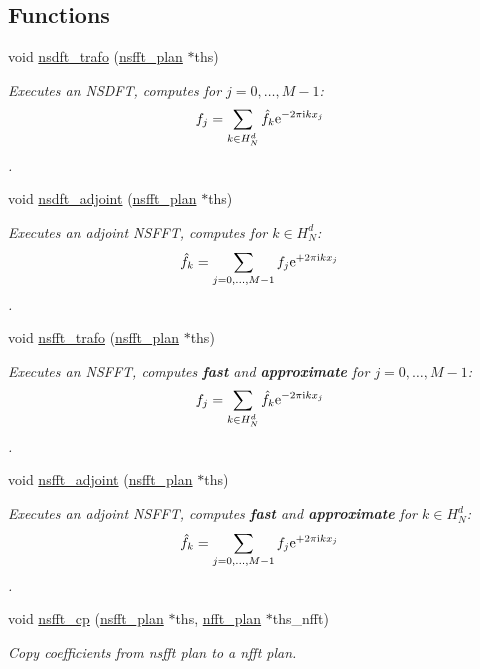 \subsection*{Functions}
\begin{CompactItemize}
\item 
void \hyperlink{group__nsfft_ga0}{nsdft\_\-trafo} (\hyperlink{structnsfft__plan}{nsfft\_\-plan} $\ast$ths)
\begin{CompactList}\small\item\em Executes an NSDFT, computes for $j=0,\hdots,M-1$: \[ f_j = \sum_{k\in H_N^d}\hat f_k {\rm e}^{-2\pi{\rm\scriptsize i}k x_j} \]. \item\end{CompactList}\item 
void \hyperlink{group__nsfft_ga1}{nsdft\_\-adjoint} (\hyperlink{structnsfft__plan}{nsfft\_\-plan} $\ast$ths)
\begin{CompactList}\small\item\em Executes an adjoint NSFFT, computes for $k\in H_N^d$: \[ \hat f_k = \sum_{j=0,\hdots,M-1} f_j {\rm e}^{+2\pi{\rm\scriptsize i}k x_j} \]. \item\end{CompactList}\item 
void \hyperlink{group__nsfft_ga2}{nsfft\_\-trafo} (\hyperlink{structnsfft__plan}{nsfft\_\-plan} $\ast$ths)
\begin{CompactList}\small\item\em Executes an NSFFT, computes {\bf fast} and {\bf approximate} for $j=0,\hdots,M-1$: \[ f_j = \sum_{k\in H_N^d}\hat f_k {\rm e}^{-2\pi{\rm\scriptsize i}k x_j} \]. \item\end{CompactList}\item 
void \hyperlink{group__nsfft_ga3}{nsfft\_\-adjoint} (\hyperlink{structnsfft__plan}{nsfft\_\-plan} $\ast$ths)
\begin{CompactList}\small\item\em Executes an adjoint NSFFT, computes {\bf fast} and {\bf approximate} for $k\in H_N^d$: \[ \hat f_k = \sum_{j=0,\hdots,M-1} f_j {\rm e}^{+2\pi{\rm\scriptsize i}k x_j} \]. \item\end{CompactList}\item 
void \hyperlink{group__nsfft_ga4}{nsfft\_\-cp} (\hyperlink{structnsfft__plan}{nsfft\_\-plan} $\ast$ths, \hyperlink{structnfft__plan}{nfft\_\-plan} $\ast$ths\_\-nfft)
\begin{CompactList}\small\item\em Copy coefficients from nsfft plan to a nfft plan. \item\end{CompactList}\item 

\end{CompactItemize}
